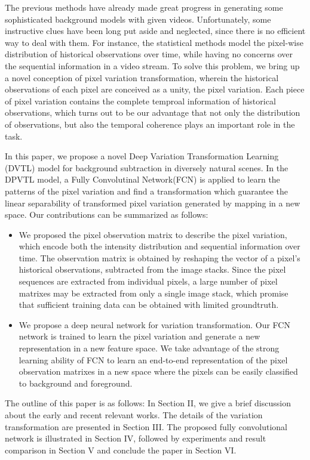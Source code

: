 \documentclass[journal]{IEEEtran}
\begin{document}
The previous methods have already made great progress in generating some sophisticated background models with given videos. Unfortunately, some instructive clues have been long put aside and neglected, since there is no efficient way to deal with them. For instance, the statistical methods model the pixel-wise distribution of historical observations over time, while having no concerns over the sequential information in a video stream. To solve this problem, we bring up a novel conception of pixel variation transformation, wherein the historical observations of each pixel are conceived as a unity, the pixel variation. Each piece of pixel variation contains the complete temproal information of historical observations, which turns out to be our advantage that not only the distribution of observations, but also the temporal coherence plays an important role in the task.

In this paper, we propose a novel Deep Variation Transformation Learning (DVTL) model for background subtraction in diversely natural scenes. In the DPVTL model, a Fully Convolutinal Network(FCN) is applied to learn the patterns of the pixel variation and find a transformation which guarantee the linear separability of transformed pixel variation generated by mapping in a new space. Our contributions can be summarized as follows:
\begin{itemize}
\item We proposed the pixel observation matrix to describe the pixel variation, which encode both the intensity distribution and sequential information over time. The observation matrix is obtained by reshaping the vector of a pixel's historical observations, subtracted from the image stacks. Since the pixel sequences are extracted from individual pixels, a large number of pixel matrixes may be extracted from only a single image stack, which promise that sufficient training data can be obtained with limited groundtruth.
\item We propose a deep neural network for variation transformation. Our FCN network is trained to learn the pixel variation and generate a new representation in a new feature space. We take advantage of the strong learning ability of FCN to learn an end-to-end representation of the pixel observation matrixes in a new space where the pixels can be easily classified to background and foreground.
\end{itemize}

The outline of this paper is as follows: In Section II, we give a brief discussion about the early and recent relevant works. The details of the variation transformation are presented in Section III. The proposed fully convolutional network is illustrated in Section IV, followed by experiments and result comparison in Section V and conclude the paper in Section VI. 
\end{document}
